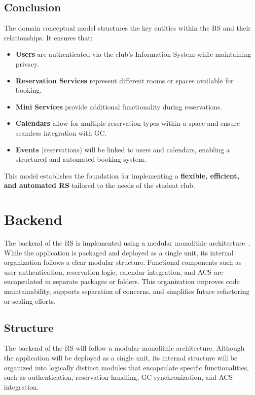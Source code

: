 \subsection{Conclusion}

The domain conceptual model structures the key entities within the RS and their relationships. It ensures that:
\begin{itemize}
	\item	\textbf{Users} are authenticated via the club’s Information System while maintaining privacy.
	\item	\textbf{Reservation Services} represent different rooms or spaces available for booking.
	\item	\textbf{Mini Services} provide additional functionality during reservations.
	\item	\textbf{Calendars} allow for multiple reservation types within a space and ensure seamless integration with GC.
	\item	\textbf{Events} (reservations) will be linked to users and calendars, enabling a structured and automated booking system.
\end{itemize}

This model establishes the foundation for implementing a \textbf{flexible, efficient, and automated RS} tailored to the needs of the student club.

\section{Backend}

The backend of the RS is implemented using a modular monolithic architecture~\cite{ibmWhatMonolithic}. While the application is packaged and deployed as a single unit, its internal organization follows a clear modular structure. Functional components such as user authentication, reservation logic, calendar integration, and ACS are encapsulated in separate packages or folders. This organization improves code maintainability, supports separation of concerns, and simplifies future refactoring or scaling efforts.

\subsection{Structure}
The backend of the RS will follow a modular monolithic architecture. Although the application will be deployed as a single unit, its internal structure will be organized into logically distinct modules that encapsulate specific functionalities, such as authentication, reservation handling, GC synchronization, and ACS integration.

